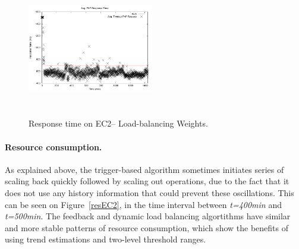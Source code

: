 \begin{figure}[tbp]
\begin{center}
\includegraphics[width=0.49\textwidth, height=6cm]{./images/heterogeneous/avgTimeout_PhP_DLBweights}
\end{center}
\vspace{-5mm}
\caption{Response time on EC2-- Load-balancing Weights.}
\label{historyWeightEC2}
\end{figure}

\paragraph{Resource consumption.}
As explained above, the trigger-based algorithm sometimes initiates
series of scaling back quickly followed by scaling out operations, 
due to the fact that it does not use any history information that could
prevent these oscillations. This can be seen on Figure~\ref{resEC2},
in the time interval between \emph{t=400min} and \emph{t=500min}.
The feedback and dynamic load balancing algortithms have similar
and more stable patterns of resource consumption, which show the
benefits of using trend estimations and two-level threshold ranges.



